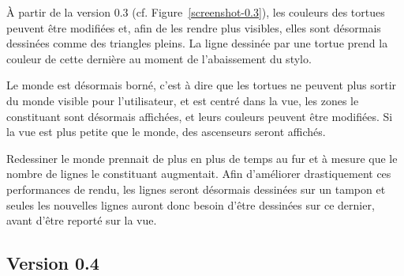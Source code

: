 À partir de la version 0.3 (cf. Figure~\ref{screenshot-0.3}), les couleurs des tortues peuvent être modifiées et, afin de les rendre plus visibles, elles sont désormais dessinées comme des triangles pleins. La ligne dessinée par une tortue prend la couleur de cette dernière au moment de l'abaissement du stylo.

Le monde est désormais borné, c'est à dire que les tortues ne peuvent plus sortir du monde visible pour l'utilisateur, et est centré dans la vue, les zones le constituant sont désormais affichées, et leurs couleurs peuvent être modifiées. Si la vue est plus petite que le monde, des ascenseurs seront affichés.

Redessiner le monde prennait de plus en plus de temps au fur et à mesure que le nombre de lignes le constituant augmentait. Afin d'améliorer drastiquement ces performances de rendu, les lignes seront désormais dessinées sur un tampon et seules les nouvelles lignes auront donc besoin d'être dessinées sur ce dernier, avant d'être reporté sur la vue.

\subsection{Version 0.4}

